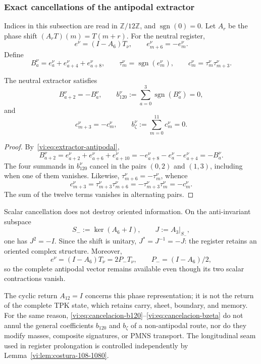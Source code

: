 \subsubsection{Exact cancellations of the antipodal extractor}
\label{vi:subsubsec:cancelaciones-antipodales}

Indices in this subsection are read in \(\mathbb Z/12\mathbb Z\), and
\(\operatorname{sgn}(0)=0\). Let \(A_r\) be the phase shift
\((A_rT)(m)=T(m+r)\). For the neutral register,
\begin{equation}
 e^\nu=(I-A_6)T_\nu,
 \qquad e^\nu_{m+6}=-e^\nu_m.
 \label{vi:eq:extractor-antipodal}
\end{equation}
Define
\[
 B_a^\nu=e_a^\nu+e_{a+4}^\nu+e_{a+8}^\nu,
 \qquad
 \tau_m^\nu=\operatorname{sgn}(e_m^\nu),
 \qquad
 c_m^\nu=\tau_m^\nu\tau_{m+3}^\nu.
\]

\begin{proposition}
\label{vi:prop:cancelaciones-antipodales}
The neutral extractor satisfies
\begin{equation}
 B_{a+2}^\nu=-B_a^\nu,\qquad
 b_{120}^\nu:=\sum_{a=0}^{3}\operatorname{sgn}(B_a^\nu)=0,
 \label{vi:eq:cancelacion-b120}
\end{equation}
and
\begin{equation}
 c_{m+3}^\nu=-c_m^\nu,\qquad
 b_\zeta^\nu:=\sum_{m=0}^{11}c_m^\nu=0.
 \label{vi:eq:cancelacion-bzeta}
\end{equation}
\end{proposition}

\begin{proof}
By~\eqref{vi:eq:extractor-antipodal},
\[
 B_{a+2}^\nu
 =e_{a+2}^\nu+e_{a+6}^\nu+e_{a+10}^\nu
 =-e_{a+8}^\nu-e_a^\nu-e_{a+4}^\nu=-B_a^\nu.
\]
The four summands in \(b_{120}^\nu\) cancel in the pairs
\((0,2)\) and \((1,3)\), including when one of them vanishes. Likewise,
\(\tau_{m+6}^\nu=-\tau_m^\nu\), whence
\[
 c_{m+3}^\nu
 =\tau_{m+3}^\nu\tau_{m+6}^\nu
 =-\tau_{m+3}^\nu\tau_m^\nu=-c_m^\nu.
\]
The sum of the twelve terms vanishes in alternating pairs.
\end{proof}

Scalar cancellation does not destroy oriented information. On the
anti-invariant subspace
\[
 S_-:=\ker(A_6+I),
 \qquad J:=A_3\big|_{S_-},
\]
one has \(J^2=-I\). Since the shift is unitary,
\(J^*=J^{-1}=-J\): the register retains an oriented complex structure.
Moreover,
\[
 e^\nu=(I-A_6)T_\nu=2P_-T_\nu,
 \qquad P_-=(I-A_6)/2,
\]
so the complete antipodal vector remains available even though its two
scalar contractions vanish.

The cyclic return \(A_{12}=I\) concerns this phase representation; it is
not the return of the complete TPK state, which retains carry, sheet,
boundary, and memory. For the same reason,
\eqref{vi:eq:cancelacion-b120}--\eqref{vi:eq:cancelacion-bzeta} do not
annul the general coefficients \(b_{120}\) and \(b_\zeta\) of a
non-antipodal route, nor do they modify masses, composite signatures, or
PMNS transport. The longitudinal seam used in register prolongation is
controlled independently by Lemma~\ref{vi:lem:costura-108-1080}.
